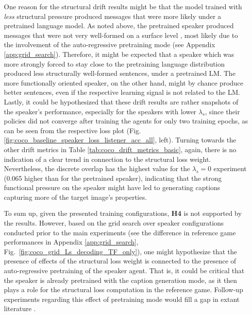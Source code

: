 One reason for the structural drift results might be that the model trained with \emph{less} structural pressure produced messages that were more likely under a pretrained language model. As noted above, the pretrained speaker produced messages that were not very well-formed on a surface level , most likely due to the involvement of the auto-regressive pretraining mode (see Appendix \ref{app:grid_search}). Therefore, it might be expected that a speaker which was more strongly forced to stay close to the pretraining language distribution produced less structurally well-formed sentences, under a pretrained LM. The more functionally oriented speaker, on the other hand, might by chance produce better sentences, even if the respective learning signal is not related to the LM. Lastly, it could be hypothesized that these drift results are rather snapshots of the speaker's performance, especially for the speakers with lower $\lambda_s$, since their policies did not converge after training the agents for only two training epochs, as can be seen from the respective loss plot (Fig. \ref{fig:coco_baseline_speaker_loss_listener_acc_all}, left). 
Turning towards the other drift metrics in Table \ref{tab:coco_drift_metrics_basic}, again, there is no indication of a clear trend in connection to the structural loss weight. Nevertheless, the discrete overlap has the highest value for the $\lambda_s = 0$ experiment (0.065 higher than for the pretrained speaker), indicating that the strong functional pressure on the speaker might have led to generating captions capturing more of the target image's properties.

To sum up, given the presented training configurations, \textbf{H4} is not supported by the results. However, based on the grid search over speaker configurations conducted prior to the main experiments (see the difference in reference game performances in Appendix \ref{app:grid_search}, Fig.~\ref{fig:coco_grid_Ls_decoding_TF_only}), one might hypothesize that the presence of effects of the structural loss weight is connected to the presence of auto-regressive pretraining of the speaker agent. That is, it could be critical that the speaker is already pretrained with the caption generation mode, as it then plays a role for the structural loss computation in the reference game. Follow-up experiments regarding this effect of pretraining mode would fill a gap in extant literature \parencite[but see][for related work]{lowe2020interaction}.

